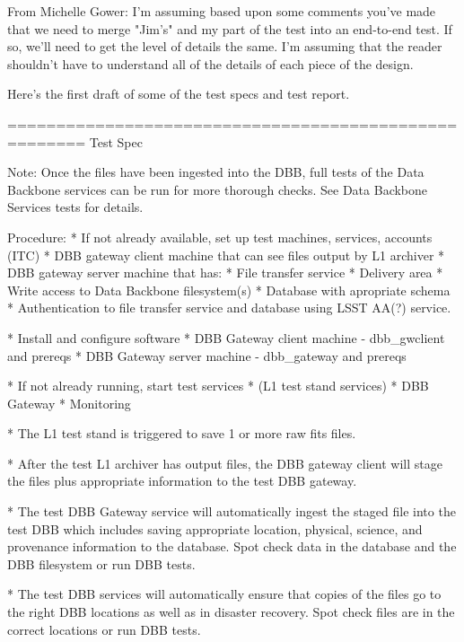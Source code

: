 \documentclass[DM,lsstdraft,STS,toc]{lsstdoc}
\begin{document}




From Michelle Gower: 
I'm assuming based upon some comments you've made that we need to merge "Jim's" and my part of the test into an end-to-end test.      If so, we'll need to get the level of details the same.    I'm assuming that the reader shouldn't have to understand all of the details of each piece of the design.    

Here's the first draft of some of the test specs and test report.

======================================================
Test Spec

Note: Once the files have been ingested into the DBB, full tests of the 
   Data Backbone services can be run for more thorough
   checks.    See Data Backbone Services tests for details.    

Procedure:
* If not already available, set up test machines,
  services, accounts (ITC)
    * DBB gateway client machine that can see files output by L1 archiver
    * DBB gateway server machine that has:
        * File transfer service
        * Delivery area
        * Write access to Data Backbone filesystem(s)
    * Database with apropriate schema
    * Authentication to file transfer service and database using LSST AA(?) service.

* Install and configure software
    * DBB Gateway client machine - dbb_gwclient and prereqs
    * DBB Gateway server machine - dbb_gateway and prereqs

* If not already running, start test services
    * (L1 test stand services)
    * DBB Gateway
    * Monitoring

* The L1 test stand is triggered to save 1 or more raw fits files.

* After the test L1 archiver has output files,
  the DBB gateway client will stage the files plus appropriate
  information to the test DBB gateway.

* The test DBB Gateway service will automatically
  ingest the staged file into the test DBB which
  includes saving appropriate location, physical, science,
  and provenance information to the database.   Spot check data 
  in the database and the DBB filesystem or run DBB tests.

* The test DBB services will automatically ensure that
  copies of the files go to the right DBB locations as well
  as in disaster recovery.    Spot check files are in the correct 
  locations or run DBB tests.
 
\end{document}

